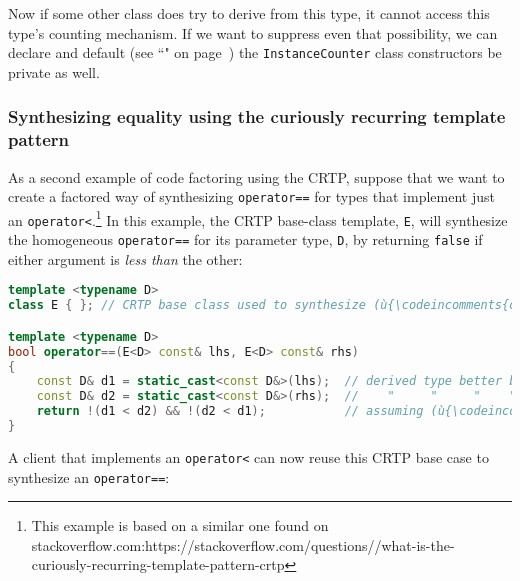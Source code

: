 \noindent Now if some other class does try to derive from this type, it cannot
access this type's counting mechanism. If we want to suppress even that
possibility, we can declare and default (see ``" on page~\pageref{defaulted-special-member-functions}) the \texttt{InstanceCounter}
class constructors be private as well.

\subsubsection[Synthesizing equality using the curiously recurring template pattern]{Synthesizing equality using the curiously recurring template pattern}\label{synthesizing-equality-using-crtp}

As a second example of code factoring using the CRTP, suppose that we want
to create a factored way of synthesizing \texttt{operator==} for types
that implement just an \texttt{operator<}.{\cprotect\footnote{This
example is based on a similar one found on stackoverflow.com:\linebreak[3]
  https://\linebreak[3]stackoverflow.\linebreak[3]com/\linebreak[3]questions//what-is-the-curiously-recurring-template-pattern-crtp}}
In this example, the CRTP base-class template, \texttt{E}, will
synthesize the homogeneous \texttt{operator==} for its parameter type,
\texttt{D}, by returning \texttt{false} if either argument is \emph{less
than} the other:

\begin{lstlisting}[language=C++]
template <typename D>
class E { }; // CRTP base class used to synthesize (ù{\codeincomments{operator==}}ù) for (ù{\codeincomments{D}}ù)

template <typename D>
bool operator==(E<D> const& lhs, E<D> const& rhs)
{
    const D& d1 = static_cast<const D&>(lhs);  // derived type better be (ù{\codeincomments{D}}ù)
    const D& d2 = static_cast<const D&>(rhs);  //    "     "     "    "  "
    return !(d1 < d2) && !(d2 < d1);           // assuming (ù{\codeincomments{D}}ù) has an (ù{\codeincomments{operator<}}ù)
}
\end{lstlisting}

\noindent A client that implements an \texttt{operator<} can now reuse this CRTP
base case to synthesize an \texttt{operator==}:

